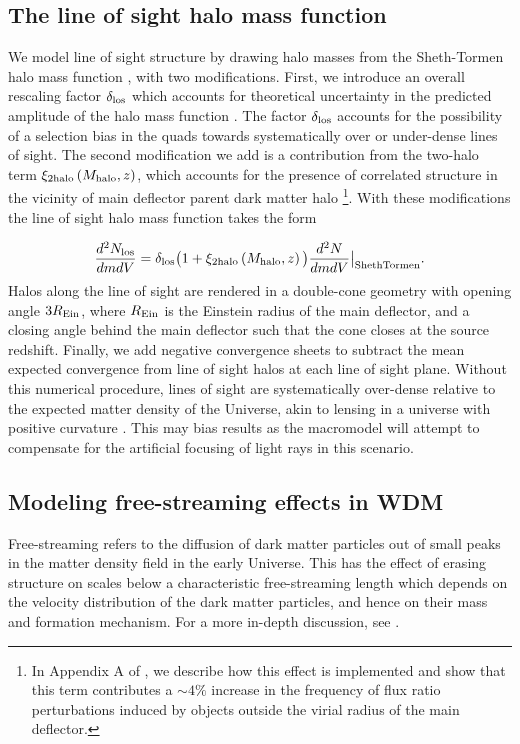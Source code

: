 \subsection{The line of sight halo mass function}
\label{ssec:losmfunc}
We model line of sight structure by drawing halo masses from the Sheth-Tormen halo mass function \cite{ST99}, with two modifications. First, we introduce an overall rescaling factor $\delta_{\rm{los}}$ which accounts for theoretical uncertainty in the predicted amplitude of the halo mass function \cite[see e.g.][]{Despali++16}. The factor $\delta_{\rm{los}}$ accounts for the possibility of a selection bias in the quads towards systematically over or under-dense lines of sight. The second modification we add is a contribution from the two-halo term $\xi_{\rm{2halo}} \left(M_{\rm{halo}}, z\right)$, which accounts for the presence of correlated structure in the vicinity of main deflector parent dark matter halo \footnote{In Appendix A of \cite{Gilman++19}, we describe how this effect is implemented and show that this term contributes a $\sim 4\%$ increase in the frequency of flux ratio perturbations induced by objects outside the virial radius of the main deflector.}. With these modifications the line of sight halo mass function takes the form

\begin{equation}
\label{eqn:losmfunc}
\frac{d^2N_{\rm{los}}}{dm  dV} = {\delta_{\rm{los}}} \big(1+ \xi_{\rm{2halo}}\left(M_{\rm{halo}}, z\right)\big) \frac{d^2N}{dm  dV} \big \vert_{\rm{ShethTormen}}.
\end{equation}
Halos along the line of sight are rendered in a double-cone geometry with opening angle $3 R_{\rm{Ein}}$, where $R_{\rm{Ein}}$ is the Einstein radius of the main deflector, and a closing angle behind the main deflector such that the cone closes at the source redshift. Finally, we add negative convergence sheets to subtract the mean expected convergence from line of sight halos at each line of sight plane. Without this numerical procedure, lines of sight are systematically over-dense relative to the expected matter density of the Universe, akin to lensing in a universe with positive curvature \cite{Birrer++17b}. This may bias results as the macromodel will attempt to compensate for the artificial focusing of light rays in this scenario.  

\subsection{Modeling free-streaming effects  in WDM}
\label{ssec:modelingwdm}
Free-streaming refers to the diffusion of dark matter particles out of small peaks in the matter density field in the early Universe. This has the effect of erasing structure on scales below a characteristic free-streaming length which depends on the velocity distribution of the dark matter particles, and hence on their mass and formation mechanism. For a more in-depth discussion, see \cite{Schneider++13}.  

